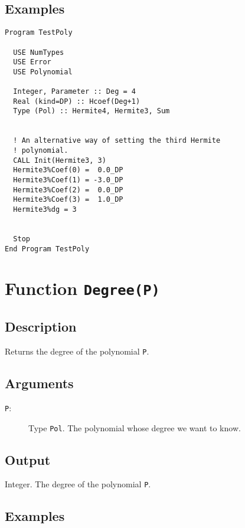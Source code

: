 \subsection{Examples}

\begin{verbatim}
Program TestPoly

  USE NumTypes
  USE Error
  USE Polynomial

  Integer, Parameter :: Deg = 4
  Real (kind=DP) :: Hcoef(Deg+1)
  Type (Pol) :: Hermite4, Hermite3, Sum


  ! An alternative way of setting the third Hermite
  ! polynomial.
  CALL Init(Hermite3, 3)
  Hermite3%Coef(0) =  0.0_DP
  Hermite3%Coef(1) = -3.0_DP
  Hermite3%Coef(2) =  0.0_DP
  Hermite3%Coef(3) =  1.0_DP
  Hermite3%dg = 3


  Stop
End Program TestPoly
\end{verbatim}

\section{Function \texttt{Degree(P)}}

\subsection{Description}

Returns the degree of the polynomial \texttt{P}.

\subsection{Arguments}

\begin{description}
\item[\texttt{P}:] Type \texttt{Pol}. The polynomial whose degree we want to
  know.  
\end{description}

\subsection{Output}

Integer. The degree of the polynomial \texttt{P}.

\subsection{Examples}

